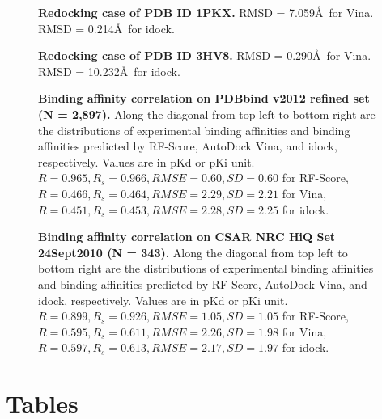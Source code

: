 \documentclass[10pt]{article}
\begin{document}
\begin{figure}[!ht]
\begin{center}
\end{center}
\caption{
{\bf Redocking case of PDB ID 1PKX.} RMSD = 7.059\AA\ for Vina. RMSD = 0.214\AA\ for idock.
}
\label{Redocking1PKX}
\end{figure}

\begin{figure}[!ht]
\begin{center}
\end{center}
\caption{
{\bf Redocking case of PDB ID 3HV8.} RMSD = 0.290\AA\ for Vina. RMSD = 10.232\AA\ for idock.
}
\label{Redocking3HV8}
\end{figure}

\begin{figure}[!ht]
\begin{center}
\end{center}
\caption{
{\bf Binding affinity correlation on PDBbind v2012 refined set (N = 2,897).} Along the diagonal from top left to bottom right are the distributions of experimental binding affinities and binding affinities predicted by RF-Score, AutoDock Vina, and idock, respectively. Values are in pKd or pKi unit. $R = 0.965, R_s = 0.966, RMSE = 0.60, SD = 0.60$ for RF-Score, $R = 0.466, R_s = 0.464, RMSE = 2.29, SD = 2.21$ for Vina, $R = 0.451, R_s = 0.453, RMSE = 2.28, SD = 2.25$ for idock.
}
\label{PDBbind2012Correlation}
\end{figure}

\begin{figure}[!ht]
\begin{center}
\end{center}
\caption{
{\bf Binding affinity correlation on CSAR NRC HiQ Set 24Sept2010 (N = 343).} Along the diagonal from top left to bottom right are the distributions of experimental binding affinities and binding affinities predicted by RF-Score, AutoDock Vina, and idock, respectively. Values are in pKd or pKi unit. $R = 0.899, R_s = 0.926, RMSE = 1.05, SD = 1.05$ for RF-Score, $R = 0.595, R_s = 0.611, RMSE = 2.26, SD = 1.98$ for Vina, $R = 0.597, R_s = 0.613, RMSE = 2.17, SD = 1.97$ for idock.
}
\label{CSARCorrelation}
\end{figure}

\section*{Tables}
\end{document}
